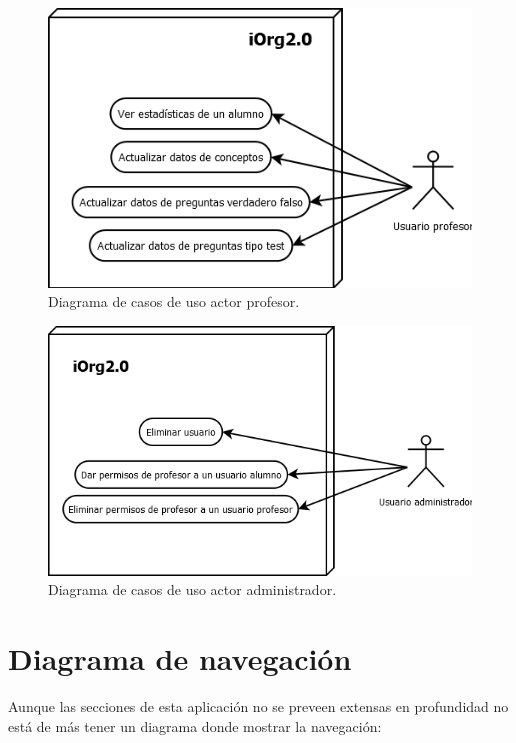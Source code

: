 \begin{figure}[!ht]
  \begin{center}
  \includegraphics[width=1\textwidth]{../images/cu_profesor.png}
  \caption{Diagrama de casos de uso actor profesor.}
  \label{fig:cu_profesor}
  \end{center}
\end{figure}

\begin{figure}[!ht]
  \begin{center}
  \includegraphics[width=1\textwidth]{../images/cu_administrador.png}
  \caption{Diagrama de casos de uso actor administrador.}
  \label{fig:cu_administrador}
  \end{center}
\end{figure}




\newpage

\section{Diagrama de navegación}
\bigskip
Aunque las secciones de esta aplicación no se preveen extensas en profundidad no está de más tener un diagrama donde mostrar la navegación:

